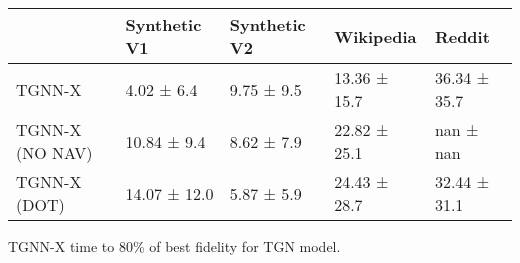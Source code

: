 \begin{tabular}{lllll}
\toprule
 & Synthetic V1 & Synthetic V2 & Wikipedia & Reddit \\
\midrule
TGNN-X & 4.02 ± 6.4 & 9.75 ± 9.5 & 13.36 ± 15.7 & 36.34 ± 35.7 \\
TGNN-X (NO NAV) & 10.84 ± 9.4 & 8.62 ± 7.9 & 22.82 ± 25.1 & nan ± nan \\
TGNN-X (DOT) & 14.07 ± 12.0 & 5.87 ± 5.9 & 24.43 ± 28.7 & 32.44 ± 31.1 \\
\bottomrule
\end{tabular}
\caption{\label{tab:tgn_time}TGNN-X time to 80\% of best fidelity for TGN model.}

